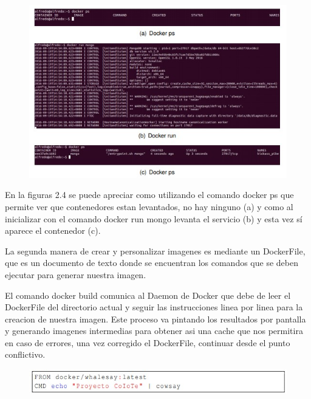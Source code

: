 \documentclass[preprint,12pt]{elsarticle}
\begin{document}
\begin{figure}[htb]
	\begin{center}
		\includegraphics[width=14cm]{./IMAGENES/foto6}
		
	\end{center}
\end{figure}

En la figuras 2.4 se puede apreciar como utilizando el comando docker ps que permite ver que contenedores estan levantados, no hay ninguno (a) y como al inicializar con el comando docker run mongo levanta el servicio (b) y esta vez sí aparece el contenedor
(c).


La segunda manera de crear y personalizar imagenes es mediante un  DockerFile, que es un documento de texto donde se encuentran los comandos que se deben ejecutar para generar nuestra imagen.

El comando docker build comunica al Daemon de Docker que debe de leer el DockerFile del directorio actual y seguir las instrucciones linea por linea para la creacion de nuestra imagen. Este proceso va pintando los resultados por pantalla y generando imagenes intermedias para obtener asi  una cache que nos permitira en caso de errores, una vez corregido el DockerFile, continuar desde el punto conflictivo.

\begin{figure}[htb]
	\begin{center}
		\includegraphics[width=14cm]{./IMAGENES/foto7}
		
	\end{center}
\end{figure}
\end{document}
